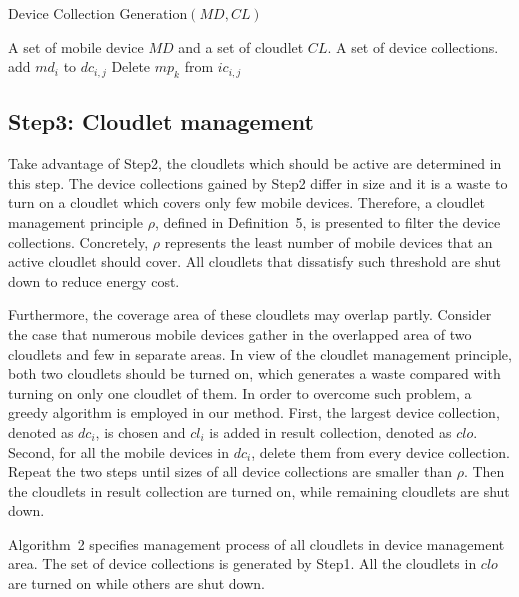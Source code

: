 \documentclass{llncs}
\begin{document}
\begin{algorithm}
\caption{Device Collection Generation$(MD, CL)$}
\begin{algorithmic}[1]
    \REQUIRE A set of mobile device $MD$ and a set of cloudlet $CL$.
    \ENSURE A set of device collections.
                \STATE add $md_i$ to $dc_{i,j}$
            \ENDIF
        \ENDFOR
    \ENDFOR
                    \STATE Delete $mp_k$ from $ic_{i,j}$
                \ENDIF
            \ENDFOR
        \ENDFOR
    \ENDFOR
\end{algorithmic}
\end{algorithm}
%
\subsection{Step3: Cloudlet management}
%
Take advantage of Step2, the cloudlets which should be active are determined in this step. The device collections gained by Step2 differ in size and it is a waste to turn on a cloudlet which covers only few mobile devices. Therefore, a cloudlet management principle $\rho$, defined in Definition~5, is presented to filter the device collections. Concretely, $\rho$ represents the least number of mobile devices that an active cloudlet should cover. All cloudlets that dissatisfy such threshold are shut down to reduce energy cost.

Furthermore, the coverage area of these cloudlets may overlap partly. Consider the case that numerous mobile devices gather in the overlapped area of two cloudlets and few in separate areas. In view of the cloudlet management principle, both two cloudlets should be turned on, which generates a waste compared with turning on only one cloudlet of them. In order to overcome such problem, a greedy algorithm is employed in our method. First, the largest device collection, denoted as $dc_i$, is chosen and $cl_i$ is added in result collection, denoted as $clo$. Second, for all the mobile devices in $dc_i$, delete them from every device collection. Repeat the two steps until sizes of all device collections are smaller than $\rho$. Then the cloudlets in result collection are turned on, while remaining cloudlets are shut down.

Algorithm~2 specifies management process of all cloudlets in device management area. The set of device collections is generated by Step1. All the cloudlets in $clo$ are turned on while others are shut down.
\end{document}
